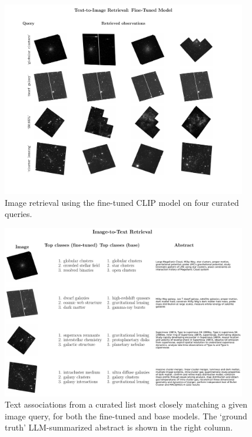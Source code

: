 \documentclass[10pt]{article} %
\begin{document}
\begin{figure}[!h]
\includegraphics[width=0.95\textwidth]{plots/tti.pdf}
\caption{Image retrieval using the fine-tuned CLIP model on four curated queries.}
\label{fig:tti}
\end{figure}

\begin{figure}[!h]
\includegraphics[width=0.95\textwidth]{plots/itt.pdf}
\caption{Text associations from a curated list most closely matching a given image query, for both the fine-tuned and base models. The `ground truth' LLM-summarized abstract is shown in the right column.}
\label{fig:itt}
\end{figure}
\end{document}
